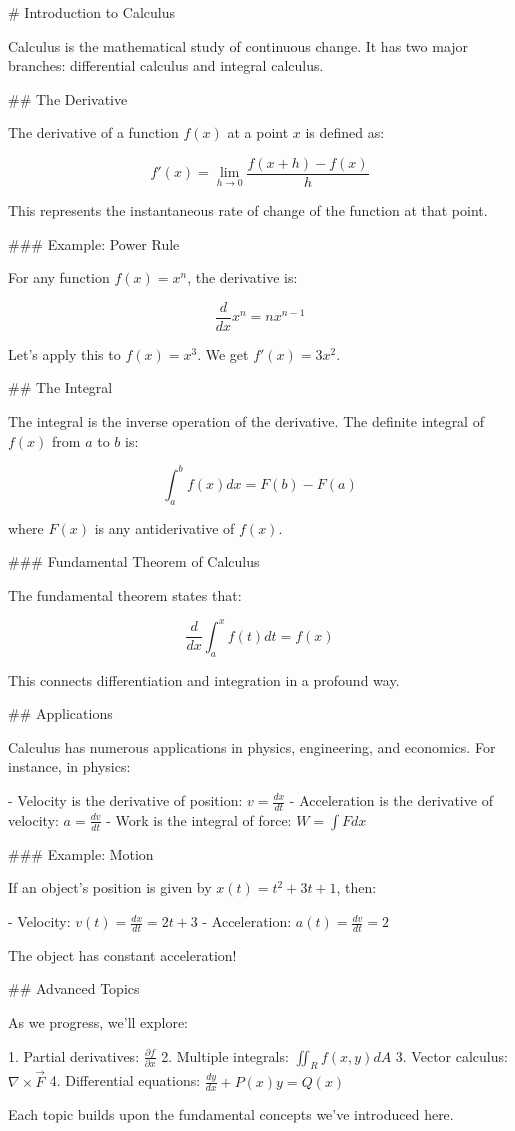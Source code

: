 # Introduction to Calculus

Calculus is the mathematical study of continuous change. It has two major branches: differential calculus and integral calculus.

## The Derivative

The derivative of a function $f(x)$ at a point $x$ is defined as:

$$f'(x) = \lim_{h \to 0} \frac{f(x+h) - f(x)}{h}$$

This represents the instantaneous rate of change of the function at that point.

### Example: Power Rule

For any function $f(x) = x^n$, the derivative is:

$$\frac{d}{dx} x^n = nx^{n-1}$$

Let's apply this to $f(x) = x^3$. We get $f'(x) = 3x^2$.

## The Integral

The integral is the inverse operation of the derivative. The definite integral of $f(x)$ from $a$ to $b$ is:

$$\int_a^b f(x) dx = F(b) - F(a)$$

where $F(x)$ is any antiderivative of $f(x)$.

### Fundamental Theorem of Calculus

The fundamental theorem states that:

$$\frac{d}{dx} \int_a^x f(t) dt = f(x)$$

This connects differentiation and integration in a profound way.

## Applications

Calculus has numerous applications in physics, engineering, and economics. For instance, in physics:

- Velocity is the derivative of position: $v = \frac{dx}{dt}$
- Acceleration is the derivative of velocity: $a = \frac{dv}{dt}$
- Work is the integral of force: $W = \int F dx$

### Example: Motion

If an object's position is given by $x(t) = t^2 + 3t + 1$, then:

- Velocity: $v(t) = \frac{dx}{dt} = 2t + 3$
- Acceleration: $a(t) = \frac{dv}{dt} = 2$

The object has constant acceleration!

## Advanced Topics

As we progress, we'll explore:

1. Partial derivatives: $\frac{\partial f}{\partial x}$
2. Multiple integrals: $\iint_R f(x,y) dA$
3. Vector calculus: $\nabla \times \vec{F}$
4. Differential equations: $\frac{dy}{dx} + P(x)y = Q(x)$

Each topic builds upon the fundamental concepts we've introduced here.